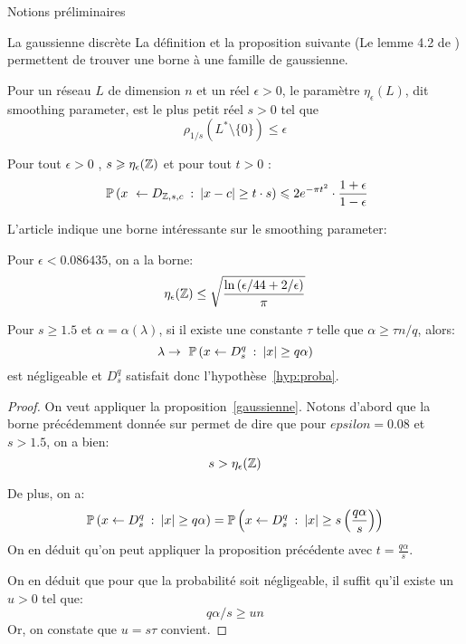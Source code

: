 \begin{section}{Notions préliminaires}
\begin{subsection}{La gaussienne discrète}
La définition et la proposition suivante (Le lemme 4.2 de \cite{STOC:GenPeiVai08}) permettent de trouver une borne à une famille de gaussienne.
\begin{definition}
Pour un réseau $L$ de dimension $n$ et un réel $\epsilon > 0$, le paramètre
$\eta_\epsilon(L)$, dit smoothing parameter, est le plus petit réel $s>0$ tel que 
	\[\rho_{1/s}(L^* \setminus \{0\}) \leqslant \epsilon\]
\end{definition}
	\begin{prop}
	\label{gaussienne}
	Pour tout $\epsilon > 0$ , $s \geqslant \eta_{\epsilon}(\mathbb{Z})$ et pour tout $t>0$ :
	\[ \PP\left(x \leftarrow D_{\ZZ, s,c}\: :\: |x-c| \geq t\cdot s\right) \leqslant 2 e^{-\pi t^2}	\cdot \frac{1+\epsilon}{1-\epsilon} \]
	\end{prop}

	L'article \cite{cryptoeprint:2018:786} indique une borne intéressante sur le smoothing parameter:
\begin{prop}
Pour $\epsilon < 0.086435$, on a la borne:
\[\eta_{\epsilon}(\mathbb{Z})  \leq
\sqrt{\frac{\ln\left(\epsilon/44 + 2/\epsilon\right)}{\pi}} \]
\end{prop}

\begin{prop}
\label{gaussienne_alpha}
Pour $s \geq 1.5$ et $\alpha = \alpha(\lambda)$, si il existe une constante $\tau$
telle que $\alpha \geq \tau n/q$, alors:
\[\lambda \rightarrow  \PP\left(x\leftarrow D^q_s\: : \: |x|\geq q \alpha \right)\]	
est négligeable et $D^q_s$ satisfait donc l'hypothèse~\ref{hyp:proba}.
\end{prop}
\begin{proof}
On veut appliquer la proposition~\ref{gaussienne}.
Notons d'abord que la borne précédemment donnée sur 
permet de dire que pour $epsilon = 0.08$ et $s > 1.5$, on a bien:
\[ s > \eta_{\epsilon}(\mathbb{Z}) \]

De plus, on a:
\begin{align*}
\mathbb{P}\left(x\leftarrow D^q_s\: : \: |x|\geq q \alpha \right) =
\mathbb{P}\left(x\leftarrow D^q_s\: : \: |x|\geq s \left(\frac{q \alpha}{s}\right)  \right)
\end{align*}
On en déduit qu'on peut appliquer la proposition précédente avec $t = \frac{q
\alpha}{s} $.

On en déduit que pour que la probabilité soit négligeable, il suffit qu'il
existe un $u > 0$ tel que:
\[q \alpha / s \geq u n\]
Or, on constate que  $u = s\tau$ convient.
\end{proof}

	\end{subsection} %
\end{section}
